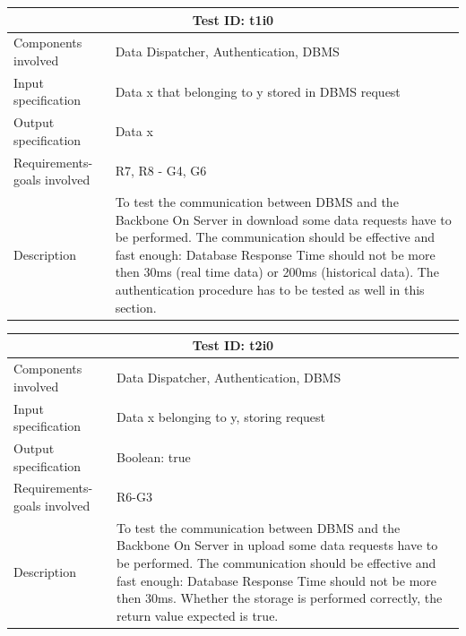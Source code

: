 \begin{table}[H]
\centering
\begin{tabular}{ |p{4.5cm}||p{11cm}|  }
 \hline
 \multicolumn{2}{|c|}{Test ID: t1i0} \\

 \hline 
 Components involved  	& 	 Data Dispatcher, Authentication, DBMS\\
 Input specification  	& 	  Data x that belonging to y stored in DBMS request\\
Output specification  	& 	 Data x\\
Requirements-goals involved & R7, R8 - G4, G6\\
Description  	& 	To test the communication between DBMS and the Backbone On Server in download some data requests have to be performed. The communication should be effective and fast enough: Database Response Time should not be more then 30ms (real time data) or 200ms (historical data). The authentication procedure has to be tested as well in this section.\\
 \hline
\end{tabular}
\end{table}
\begin{table}[H]
\centering
\begin{tabular}{ |p{4.5cm}||p{11cm}|  }
 \hline
 \multicolumn{2}{|c|}{Test ID: t2i0} \\
 
 \hline 
 Components involved  	& 	 Data Dispatcher, Authentication, DBMS\\
 Input specification  	& 	  Data x belonging to y, storing request\\
Output specification  	& 	Boolean: true\\
Requirements-goals involved & R6-G3\\
Description  	& 	 To test the communication between DBMS and the Backbone On Server in upload some data requests have to be performed. The communication should be effective and fast enough: Database Response Time should not be more then 30ms. Whether the storage is performed correctly, the return value expected is true.\\
 \hline
\end{tabular}
\end{table}
